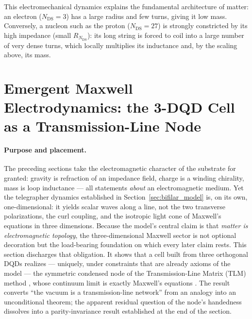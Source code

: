 \documentclass[11pt,a4paper]{article}
\theoremstyle{plain}
\theoremstyle{remark}
\newcommand{\Ncd}{\ensuremath{N_{\mathrm{DS}}}}
\begin{document}
This electromechanical dynamics explains the fundamental architecture of matter: an electron ($\Ncd=3$) has a large radius and few turns, giving it low mass. Conversely, a nucleon such as the proton ($\Ncd=27$) is strongly constricted by its high impedance (small $R_{\Ncd}$): its long string is forced to coil into a large number of very dense turns, which locally multiplies its inductance and, by the scaling above, its mass.

\section{Emergent Maxwell Electrodynamics: the 3-DQD Cell as a Transmission-Line Node}
\label{sec:maxwell3d}

\paragraph{Purpose and placement.} The preceding sections take the electromagnetic character of the substrate for granted: gravity is refraction of an impedance field, charge is a winding chirality, mass is loop inductance --- all statements \emph{about} an electromagnetic medium. Yet the telegrapher dynamics established in Section~\ref{sec:bifilar_model} is, on its own, one-dimensional: it yields scalar waves along a line, not the two transverse polarizations, the curl coupling, and the isotropic light cone of Maxwell's equations in three dimensions. Because the model's central claim is that \emph{matter is electromagnetic topology}, the three-dimensional Maxwell sector is not optional decoration but the load-bearing foundation on which every later claim rests. This section discharges that obligation. It shows that a cell built from three orthogonal DQDs realizes --- uniquely, under constraints that are already axioms of the model --- the symmetric condensed node of the Transmission-Line Matrix (TLM) method \cite{johns1971,johns1987}, whose continuum limit is exactly Maxwell's equations \cite{taflove}. The result converts ``the vacuum is a transmission-line network'' from an analogy into an unconditional theorem; the apparent residual question of the node's handedness dissolves into a parity-invariance result established at the end of the section.
\end{document}
